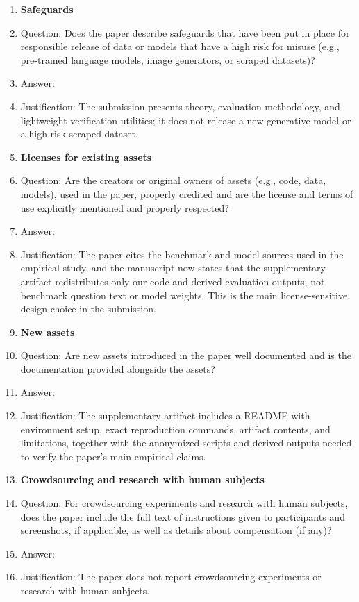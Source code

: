 \begin{enumerate}
\item {\bf Safeguards}
    \item[] Question: Does the paper describe safeguards that have been put in place for responsible release of data or models that have a high risk for misuse (e.g., pre-trained language models, image generators, or scraped datasets)?
    \item[] Answer: \answerNA{}
    \item[] Justification: The submission presents theory, evaluation methodology, and lightweight verification utilities; it does not release a new generative model or a high-risk scraped dataset.

\item {\bf Licenses for existing assets}
    \item[] Question: Are the creators or original owners of assets (e.g., code, data, models), used in the paper, properly credited and are the license and terms of use explicitly mentioned and properly respected?
    \item[] Answer: \answerYes{}
    \item[] Justification: The paper cites the benchmark and model sources used in the empirical study, and the manuscript now states that the supplementary artifact redistributes only our code and derived evaluation outputs, not benchmark question text or model weights. This is the main license-sensitive design choice in the submission.

\item {\bf New assets}
    \item[] Question: Are new assets introduced in the paper well documented and is the documentation provided alongside the assets?
    \item[] Answer: \answerYes{}
    \item[] Justification: The supplementary artifact includes a README with environment setup, exact reproduction commands, artifact contents, and limitations, together with the anonymized scripts and derived outputs needed to verify the paper's main empirical claims.

\item {\bf Crowdsourcing and research with human subjects}
    \item[] Question: For crowdsourcing experiments and research with human subjects, does the paper include the full text of instructions given to participants and screenshots, if applicable, as well as details about compensation (if any)?
    \item[] Answer: \answerNA{}
    \item[] Justification: The paper does not report crowdsourcing experiments or research with human subjects.


\end{enumerate}

